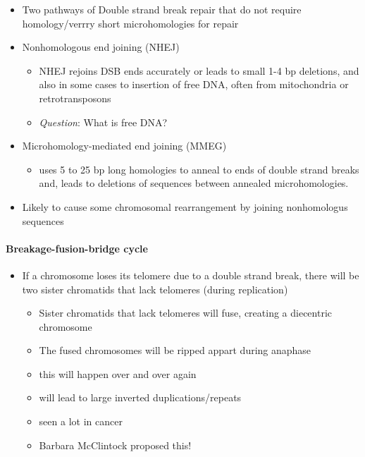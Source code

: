 \documentclass[]{book}
\providecommand{\tightlist}{%
  \setlength{\itemsep}{0pt}\setlength{\parskip}{0pt}}
\let\oldparagraph\paragraph
\renewcommand{\paragraph}[1]{\oldparagraph{#1}\mbox{}}
\begin{document}
\begin{itemize}
\tightlist
\item
  Two pathways of Double strand break repair that do not require homology/verrry short microhomologies for repair
\item
  Nonhomologous end joining (NHEJ)

  \begin{itemize}
  \tightlist
  \item
    NHEJ rejoins DSB ends accurately or leads to small 1-4 bp deletions, and also in some cases to insertion of free DNA, often from mitochondria or retrotransposons
  \item
    \emph{Question}: What is free DNA?
  \end{itemize}
\item
  Microhomology-mediated end joining (MMEG)

  \begin{itemize}
  \tightlist
  \item
    uses 5 to 25 bp long homologies to anneal to ends of double strand breaks and, leads to deletions of sequences between annealed microhomologies.
  \end{itemize}
\item
  Likely to cause some chromosomal rearrangement by joining nonhomologus sequences
\end{itemize}

\hypertarget{breakage-fusion-bridge-cycle}{%
\paragraph{Breakage-fusion-bridge cycle}\label{breakage-fusion-bridge-cycle}}

\begin{itemize}
\tightlist
\item
  If a chromosome loses its telomere due to a double strand break, there will be two sister chromatids that lack telomeres (during replication)

  \begin{itemize}
  \tightlist
  \item
    Sister chromatids that lack telomeres will fuse, creating a diecentric chromosome
  \item
    The fused chromosomes will be ripped appart during anaphase
  \item
    this will happen over and over again
  \item
    will lead to large inverted duplications/repeats
  \item
    seen a lot in cancer
  \item
    Barbara McClintock proposed this!
  \end{itemize}
\end{itemize}
\end{document}
